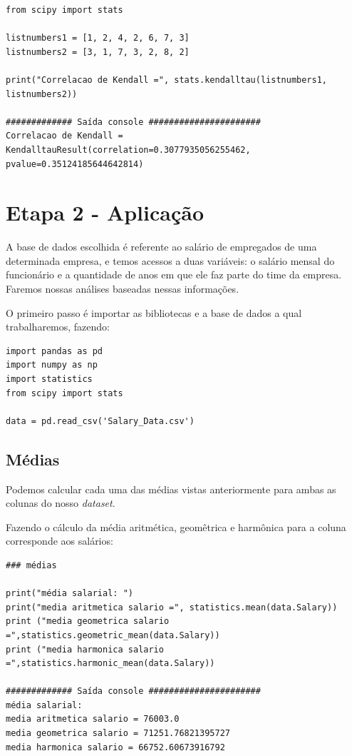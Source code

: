\documentclass{article}
\begin{document}
\begin{verbatim}
from scipy import stats

listnumbers1 = [1, 2, 4, 2, 6, 7, 3]
listnumbers2 = [3, 1, 7, 3, 2, 8, 2]

print("Correlacao de Kendall =", stats.kendalltau(listnumbers1, listnumbers2))

############# Saída console ######################
Correlacao de Kendall = 
KendalltauResult(correlation=0.3077935056255462, pvalue=0.35124185644642814)
\end{verbatim}

\section{Etapa 2 - Aplicação}
A base de dados escolhida é referente ao salário de empregados de uma determinada empresa, e temos acessos a duas variáveis: o salário mensal do funcionário e a quantidade de anos em que ele faz parte do time da empresa. Faremos nossas análises baseadas nessas informações. 

O primeiro passo é importar as bibliotecas e a base de dados a qual trabalharemos, fazendo:

\begin{verbatim}
import pandas as pd
import numpy as np
import statistics
from scipy import stats

data = pd.read_csv('Salary_Data.csv')
\end{verbatim}

\subsection{Médias}
Podemos calcular cada uma das médias vistas anteriormente para ambas as colunas do nosso {\it dataset}. 

Fazendo o cálculo da média aritmética, geomêtrica e harmônica para a coluna corresponde aos salários:

\begin{verbatim}
### médias

print("média salarial: ")
print("media aritmetica salario =", statistics.mean(data.Salary))
print ("media geometrica salario =",statistics.geometric_mean(data.Salary))
print ("media harmonica salario =",statistics.harmonic_mean(data.Salary))

############# Saída console ######################
média salarial: 
media aritmetica salario = 76003.0
media geometrica salario = 71251.76821395727
media harmonica salario = 66752.60673916792 
\end{verbatim}
\end{document}
